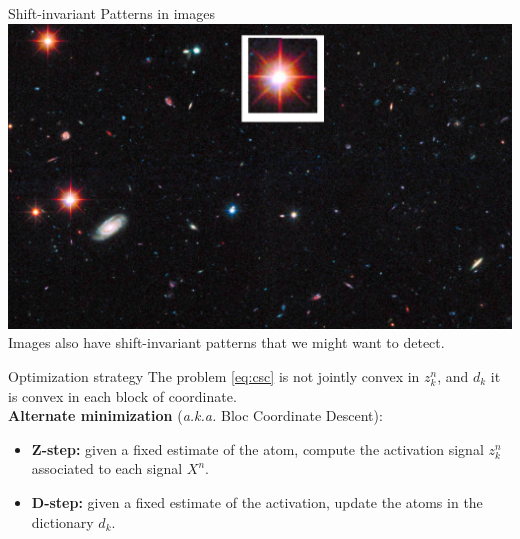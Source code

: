 \documentclass{beamer}
\def\keypoint#1{\hfill\textcolor{gray}{#1}}
\def\mycite#1{\keypoint{\normalsize\cite{#1}}}
\begin{document}
\begin{frame}{Shift-invariant Patterns in images}
\centering
\includegraphics[height=.7\textheight]{cosmostat}\\[1em]
Images also have shift-invariant patterns that we might want to detect.
\end{frame}



\begin{frame}{Optimization strategy}
The problem \autoref{eq:csc} is not jointly convex in $z^n_k$, and  $d_k$ it is convex in each block of coordinate.\\[1em]

\textbf{Alternate minimization} (\emph{a.k.a.} Bloc Coordinate Descent):\\[.5em]

\begin{itemize}\itemsep1em
    \item \textbf{Z-step:} given a fixed estimate of the atom, compute the activation signal $z^n_k$ associated to each signal $X^n$.
    \item \textbf{D-step:} given a fixed estimate of the activation, update the atoms in the dictionary $d_k$.
\end{itemize}
\end{frame}
\end{document}
